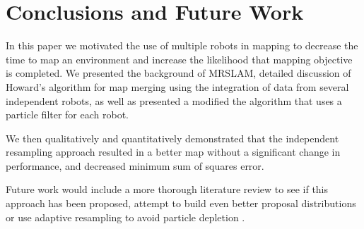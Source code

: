\section{Conclusions and Future Work}

In this paper we motivated the use of multiple robots in mapping to decrease the time to map an environment and increase the likelihood that mapping objective is completed.  We presented the background of MRSLAM, detailed discussion of Howard’s algorithm \cite{howard2006multi} for map merging using the integration of data from several independent robots, as well as presented a modified the algorithm that uses a particle filter for each robot.  

We then qualitatively and quantitatively demonstrated that the independent resampling approach resulted in a better map without a significant change in performance, and decreased minimum sum of squares error.

Future work would include a more thorough literature review to see if this approach has been proposed, attempt to build even better proposal distributions or use adaptive resampling to avoid particle depletion \cite{Grisetti2007}.
